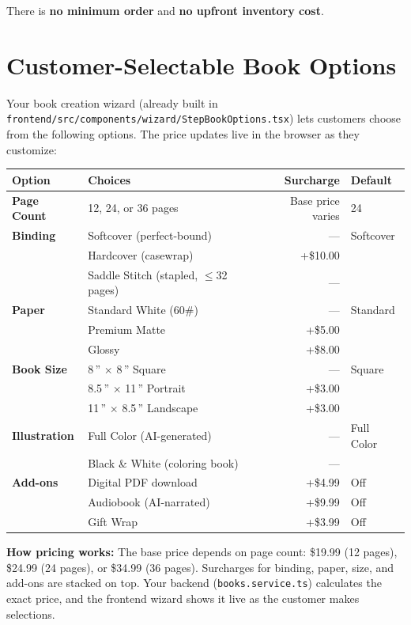 \documentclass[12pt, letterpaper, oneside]{book}
\begin{document}
\noindent There is \textbf{no minimum order} and \textbf{no upfront inventory cost}.

\section{Customer-Selectable Book Options}

Your book creation wizard (already built in \texttt{frontend/src/components/wizard/StepBookOptions.tsx}) lets customers choose from the following options. The price updates live in the browser as they customize:

\begin{table}[H]
\centering
\small
\begin{tabularx}{\textwidth}{lXrl}
\toprule
\textbf{Option} & \textbf{Choices} & \textbf{Surcharge} & \textbf{Default} \\
\midrule
\textbf{Page Count} & 12, 24, or 36 pages & Base price varies & 24 \\
\textbf{Binding} & Softcover (perfect-bound) & --- & Softcover \\
& Hardcover (casewrap) & +\$10.00 & \\
& Saddle Stitch (stapled, $\leq$32 pages) & --- & \\
\textbf{Paper} & Standard White (60\#) & --- & Standard \\
& Premium Matte & +\$5.00 & \\
& Glossy & +\$8.00 & \\
\textbf{Book Size} & 8\,'' $\times$ 8\,'' Square & --- & Square \\
& 8.5\,'' $\times$ 11\,'' Portrait & +\$3.00 & \\
& 11\,'' $\times$ 8.5\,'' Landscape & +\$3.00 & \\
\textbf{Illustration} & Full Color (AI-generated) & --- & Full Color \\
& Black \& White (coloring book) & --- & \\
\textbf{Add-ons} & Digital PDF download & +\$4.99 & Off \\
& Audiobook (AI-narrated) & +\$9.99 & Off \\
& Gift Wrap & +\$3.99 & Off \\
\bottomrule
\end{tabularx}
\end{table}

\begin{infobox}
\textbf{How pricing works:} The base price depends on page count: \$19.99 (12 pages), \$24.99 (24 pages), or \$34.99 (36 pages). Surcharges for binding, paper, size, and add-ons are stacked on top. Your backend (\texttt{books.service.ts}) calculates the exact price, and the frontend wizard shows it live as the customer makes selections.
\end{infobox}
\end{document}
